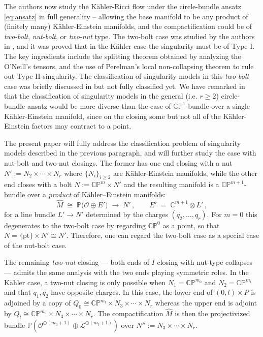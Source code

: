 \documentclass[11pt]{amsart}
\theoremstyle{plain}
\numberwithin{equation}{section}
\theoremstyle{definition}
\theoremstyle{remark}
\begin{document}
The authors now study the K\"ahler-Ricci flow under the circle-bundle ansatz \eqref{eq:ansatz} in full generality -- allowing the base manifold to be any product of (finitely many) K\"ahler-Einstein manifolds, and the compactification could be of \emph{two-bolt}, \emph{nut-bolt}, or \emph{two-nut} type. The two-bolt case was studied by the authors in \cite{FT}, and it was proved that in the K\"ahler case the singularity must be of Type I. The key ingredients include the splitting theorem obtained by analyzing the O'Neill's tensors, and the use of Perelman's local non-collapsing theorem to rule out Type II singularity. The classification of singularity models in this \emph{two-bolt} case was briefly discussed in \cite{FT} but not fully classified yet. We have remarked in \cite{FT} that the classification of singularity models in the general (i.e. $r \geq 2$) circle-bundle ansatz would be more diverse than the case of $\mathbb{CP}^1$-bundle over a single K\"ahler-Einstein manifold, since on the closing some but not all of the K\"ahler-Einstein factors may contract to a point.

The present paper will fully address the classification problem of singularity models described in the previous paragraph, and will further study the case with nut-bolt and two-nut closings. The former has one end closing with a nut $N' := N_2 \times \cdots \times N_r$ where $\{N_i\}_{i\geq 2}$ are K\"ahler-Einstein manifolds, while the other end closes with a bolt $N := \mathbb{CP}^m \times N'$ and the resulting manifold is a $\mathbb{CP}^{m+1}$-bundle over a \emph{product} of K\"ahler--Einstein manifolds:
\[
\widehat{M} \;\cong\; \mathbb{P} \big( \mathcal{O} \oplus E' \big) \;\longrightarrow\; N' \,, \qquad E' \;=\; \mathbb{C}^{m+1} \otimes L' \,,
\]
for a line bundle $L' \to N'$ determined by the charges $( q_2, \dots, q_r )$.  For $m = 0$ this degenerates to the two-bolt case by regarding $\mathbb{CP}^0$ as a point, so that $N = \{\textrm{pt}\} \times N' \cong N'$. Therefore, one can regard the two-bolt case as a special case of the nut-bolt case.

The remaining \emph{two-nut} closing --- both ends of $I$ closing with nut-type collapses --- admits the same analysis with the two ends playing symmetric roles. In the K\"ahler case, a two-nut closing is only possible when $N_1 = \mathbb{CP}^{m_0}$ and $N_2 = \mathbb{CP}^{m_l}$ and that $q_1, q_2$ have opposite charges. In this case, the lower end of $(0,l) \times P$ is adjoined by a copy of $Q_0 \cong \mathbb{CP}^{m_l} \times N_3 \times \cdots \times N_r$ whereas the upper end is adjoint by $Q_l \cong \mathbb{CP}^{m_0} \times N_3 \times \cdots \times N_r$. The compactification $\widehat{M}$ is then the projectivized bundle $\mathbb{P}(\mathcal{O}^{\oplus(m_0+1)} \oplus \mathcal{L}^{\oplus(m_l+1)})$ over $N'' := N_3 \times \cdots \times N_r$.
\end{document}

